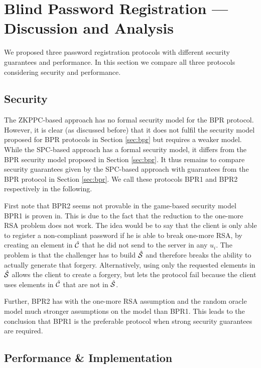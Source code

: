 \section{Blind Password Registration --- Discussion and Analysis} \label{sec:discussion}

We proposed three password registration protocols with different security guarantees and performance.
In this section we compare all three protocols considering security and performance.

\subsection{Security} \label{sec:bpr-security-analysis}
The \ac{ZKPPC}-based approach has no formal security model for the \ac{BPR} protocol.
However, it is clear (as discussed before) that it does not fulfil the security model proposed for \ac{BPR} protocols in Section \ref{sec:bpr} but requires a weaker model.
While the \ac{SPC}-based approach has a formal security model, it differs from the \ac{BPR} security model proposed in Section \ref{sec:bpr}.
It thus remains to compare security guarantees given by the \ac{SPC}-based approach with guarantees from the \ac{BPR} protocol in Section \ref{sec:bpr}.
We call these protocols BPR1 and BPR2 respectively in the following.

First note that BPR2 seems not provable in the game-based security model BPR1 is proven in.
This is due to the fact that the reduction to the one-more RSA problem does not work.
The idea would be to say that the client is only able to register a non-compliant password if he is able to break one-more RSA, \ie by creating an
element in $\hat{\mathcal{C}}$ that he did not send to the server in any $u_i$. 
The problem is that the challenger has to build $\hat{\mathcal{S}}$ and therefore breaks the ability to actually generate that forgery. 
Alternatively, using only the requested elements in $\hat{\mathcal{S}}$ allows the client to create a forgery, but lets the protocol fail because the client uses elements in $\hat{\mathcal{C}}$ that are not in $\hat{\mathcal{S}}$.

Further, BPR2 has with the one-more RSA assumption and the random oracle model much stronger assumptions on the model than BPR1.
This leads to the conclusion that BPR1 is the preferable protocol when strong security guarantees are required.

\subsection{Performance \& Implementation} \label{sec:performance}

